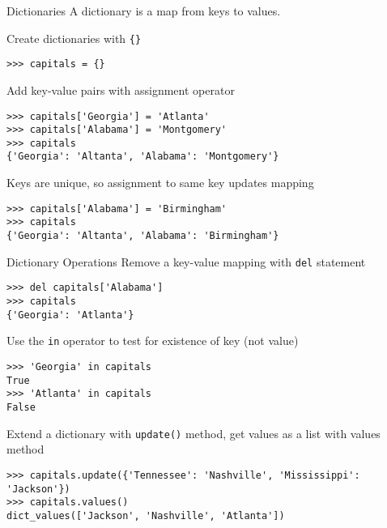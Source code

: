 \documentclass[smaller]{beamer}
\begin{document}
\begin{frame}[label={sec:org3285a93},fragile]{Dictionaries}
 A dictionary is a map from keys to values.

Create dictionaries with \texttt{\{\}}

\lstset{language=Python,label= ,caption= ,captionpos=b,numbers=none}
\begin{lstlisting}
>>> capitals = {}
\end{lstlisting}

Add key-value pairs with assignment operator

\lstset{language=Python,label= ,caption= ,captionpos=b,numbers=none}
\begin{lstlisting}
>>> capitals['Georgia'] = 'Atlanta'
>>> capitals['Alabama'] = 'Montgomery'
>>> capitals
{'Georgia': 'Altanta', 'Alabama': 'Montgomery'}
\end{lstlisting}

Keys are unique, so assignment to same key updates mapping

\lstset{language=Python,label= ,caption= ,captionpos=b,numbers=none}
\begin{lstlisting}
>>> capitals['Alabama'] = 'Birmingham'
>>> capitals
{'Georgia': 'Altanta', 'Alabama': 'Birmingham'}
\end{lstlisting}
\end{frame}

\begin{frame}[label={sec:orgbecb8aa},fragile]{Dictionary Operations}
 Remove a key-value mapping with \texttt{del} statement

\lstset{language=Python,label= ,caption= ,captionpos=b,numbers=none}
\begin{lstlisting}
>>> del capitals['Alabama']
>>> capitals
{'Georgia': 'Atlanta'}
\end{lstlisting}

Use the \texttt{in} operator to test for existence of key (not value)

\lstset{language=Python,label= ,caption= ,captionpos=b,numbers=none}
\begin{lstlisting}
>>> 'Georgia' in capitals
True
>>> 'Atlanta' in capitals
False
\end{lstlisting}

Extend a dictionary with \texttt{update()} method, get values as a list
with values method

\lstset{language=Python,label= ,caption= ,captionpos=b,numbers=none}
\begin{lstlisting}
>>> capitals.update({'Tennessee': 'Nashville', 'Mississippi':
'Jackson'})
>>> capitals.values()
dict_values(['Jackson', 'Nashville', 'Atlanta'])
\end{lstlisting}
\end{frame}
\end{document}
